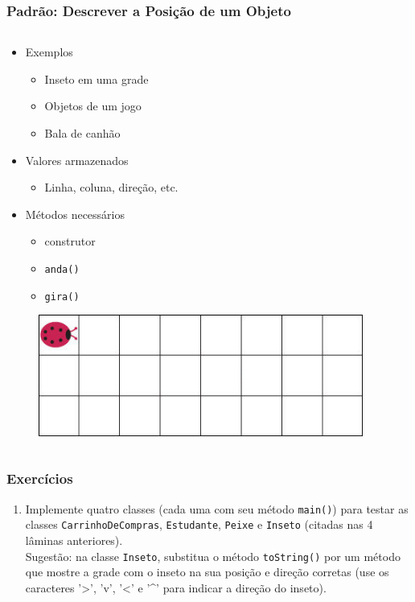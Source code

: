 \documentclass[xcolor={dvipsnames,table},aspectratio=169]{beamer}
\begin{document}
\begin{frame}[fragile]\frametitle{Padrão: Descrever a Posição de um Objeto}
\begin{columns}[T]
	\begin{column}{0.4\linewidth}
\begin{itemize}
	\item Exemplos
	\begin{itemize}
		\item Inseto em uma grade
		\item Objetos de um jogo
		\item Bala de canhão
	\end{itemize}
	\item Valores armazenados
	\begin{itemize}
		\item Linha, coluna, direção, etc.
	\end{itemize}
	\item Métodos necessários
	\begin{itemize}
		\item construtor
		\item \texttt{anda()}
		\item \texttt{gira()}
	\end{itemize}
\end{itemize}
\begin{figure}[h]
	\includegraphics[height=0.16\paperheight,center]{pucrs-ep-fprog-unidade_07-objetos_e_classes-laminas-inseto.jpg}
\end{figure}
	\end{column}
	\begin{column}{0.6\linewidth}
{\tiny\inputminted[bgcolor=cyan!10]{java}{src/inseto1/Inseto.java}}
	\end{column}
\end{columns}
\end{frame}

\begin{frame}[fragile]\frametitle{Exercícios}
\begin{enumerate}
	\item Implemente quatro classes (cada uma com seu método \texttt{main()}) para testar as classes \texttt{CarrinhoDeCompras}, \texttt{Estudante}, \texttt{Peixe} e \texttt{Inseto} (citadas nas 4 lâminas anteriores).\\Sugestão: na classe \texttt{Inseto}, substitua o método \texttt{toString()} por um método que mostre a grade com o inseto na sua posição e direção corretas (use os caracteres '>', 'v', '<' e '\textasciicircum' para indicar a direção do inseto).	
\end{enumerate}
\end{frame}
\end{document}
